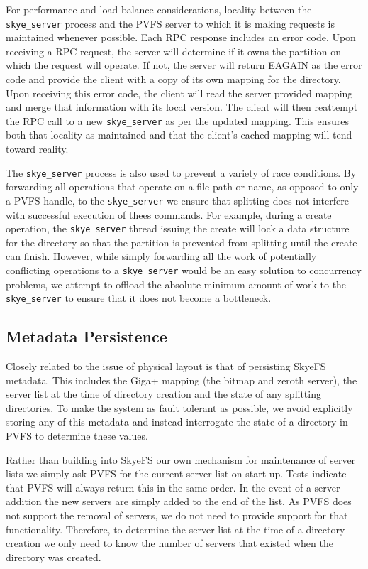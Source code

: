 \documentclass[letterpaper]{article}
\newcommand{\code}[1]{\texttt{#1}}
\begin{document}
For performance and load-balance considerations, locality between the
\code{skye\_\-server} process and the PVFS server to which it is making
requests is maintained whenever possible.  Each RPC response includes an error
code.  Upon receiving a RPC request, the server will determine if it owns the
partition on which the request will operate.  If not, the server will return
EAGAIN as the error code and provide the client with a copy of its own mapping
for the directory.  Upon receiving this error code, the client will read the
server provided mapping and merge that information with its local version.
The client will then reattempt the RPC call to a new \code{skye\_\-server} as
per the updated mapping.  This ensures both that locality as maintained and
that the client's cached mapping will tend toward reality.

The \code{skye\_\-server} process is also used to prevent a variety of race conditions.
By forwarding all operations that operate on a file path or name, as opposed to
only a PVFS handle, to the \code{skye\_\-server} we ensure that splitting does not
interfere with successful execution of thees commands.  For example, during a
create operation, the \code{skye\_\-server} thread issuing the create will lock a data
structure for the directory so that the partition is prevented from splitting
until the create can finish.  However, while simply forwarding all the work of
potentially conflicting operations to a \code{skye\_\-server} would be an easy solution to
concurrency problems, we attempt to offload the absolute minimum amount of work
to the \code{skye\_\-server} to ensure that it does not become a bottleneck.

\subsection{Metadata Persistence}
Closely related to the issue of physical layout is that of persisting SkyeFS
metadata.  This includes the Giga+ mapping (the bitmap and zeroth server), the
server list at the time of directory creation and the state of any splitting
directories.  To make the system as fault tolerant as possible, we avoid
explicitly storing any of this metadata and instead interrogate the state of a
directory in PVFS to determine these values.

Rather than building into SkyeFS our own mechanism for maintenance of server
lists we simply ask PVFS for the current server list on start up.  Tests indicate
that PVFS will always return this in the same order.  In the event of a server
addition the new servers are simply added to the end of the list.  As PVFS does
not support the removal of servers, we do not need to provide support for that
functionality.  Therefore, to determine the server list at the time of a
directory creation we only need to know the number of servers that existed when
the directory was created.
\end{document}
